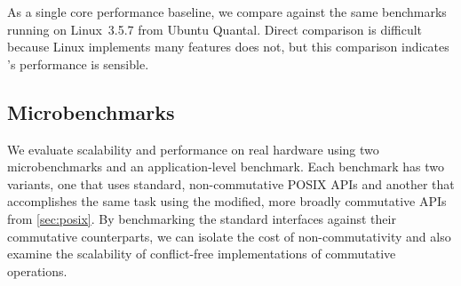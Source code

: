 As a single core performance baseline, we compare against the same
benchmarks running on Linux~3.5.7 from Ubuntu Quantal.  Direct
comparison is difficult because
Linux implements many features \sys does not, but this comparison
indicates \sys's performance is sensible.

\subsection{Microbenchmarks}
\label{sec:eval:microbenchmarks}




We evaluate scalability and performance on real hardware using two
microbenchmarks and an application-level benchmark.  Each benchmark has
two variants, one that uses standard, non-commutative POSIX APIs and
another that accomplishes the same task using the modified, more broadly
commutative APIs from \cref{sec:posix}.
%
By benchmarking the standard interfaces against
their commutative counterparts, we can isolate the cost of
non-commutativity and also examine the scalability of
conflict-free implementations of commutative operations.

